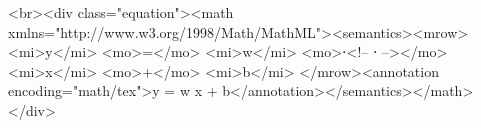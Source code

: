 <br><div class="equation"><math xmlns="http://www.w3.org/1998/Math/MathML"><semantics><mrow>
  <mi>y</mi>
  <mo>=</mo>
  <mi>w</mi>
  <mo>⋅<!-- ⋅ --></mo>
  <mi>x</mi>
  <mo>+</mo>
  <mi>b</mi>
</mrow><annotation encoding="math/tex">y = w \cdot x + b</annotation></semantics></math></div>